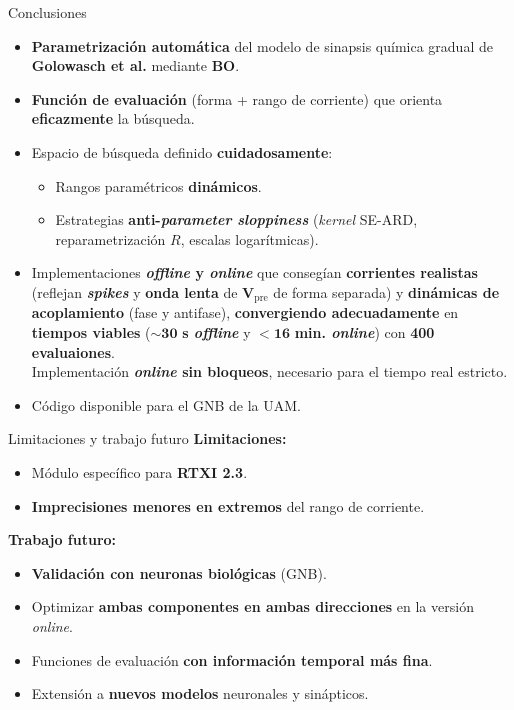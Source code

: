 \documentclass[10pt, aspectratio=169]{beamer}
\begin{document}
\begin{frame}{Conclusiones}
    \small
    \begin{itemize}
        \item \textbf{Parametrización automática} del modelo de sinapsis química gradual de \textbf{Golowasch et al.} mediante \textbf{BO}.
        \item \textbf{Función de evaluación} (forma + rango de corriente) que orienta \textbf{eficazmente} la búsqueda.
        \item Espacio de búsqueda definido \textbf{cuidadosamente}:
              \begin{itemize}
                  \item Rangos paramétricos \textbf{dinámicos}.
                  \item Estrategias \textbf{anti-\textit{parameter sloppiness}} (\textit{kernel} SE-ARD, reparametrización $R$, escalas logarítmicas).
              \end{itemize}
        \item Implementaciones \textbf{\textit{offline} y \textit{online}} que consegían \textbf{corrientes realistas} (reflejan \textbf{\textit{spikes}} y \textbf{onda lenta} de $\boldsymbol{V_{\mathrm{pre}}}$ de forma separada) y \textbf{dinámicas de acoplamiento} (fase y antifase),  \textbf{convergiendo adecuadamente} en \textbf{tiempos viables} ($\boldsymbol{\sim 30}$ \textbf{s \textit{offline}} y $\boldsymbol{< 16}$ \textbf{min. \textit{online}}) con \textbf{400 evaluaiones}.\\[0.5em]
              Implementación \textbf{\textit{online} sin bloqueos}, necesario para el tiempo real estricto.
        \item Código disponible para el GNB de la UAM.
    \end{itemize}
\end{frame}


\begin{frame}{Limitaciones y trabajo futuro}
    \textbf{Limitaciones:}
    \begin{itemize}
        \item Módulo específico para \textbf{RTXI 2.3}.
        \item \textbf{Imprecisiones menores en extremos} del rango de corriente.
    \end{itemize}
    \vspace{0.8em}
    \textbf{Trabajo futuro:}
    \begin{itemize}
        \item \textbf{Validación con neuronas biológicas} (GNB).
        \item Optimizar \textbf{ambas componentes en ambas direcciones} en la versión \textit{online}.
        \item Funciones de evaluación \textbf{con información temporal más fina}.
        \item Extensión a \textbf{nuevos modelos} neuronales y sinápticos.
    \end{itemize}
\end{frame}
\end{document}
